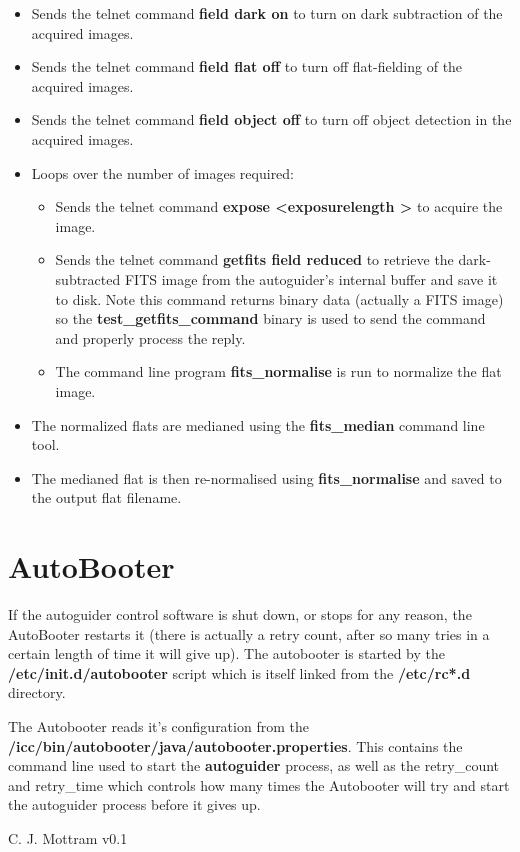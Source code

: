 \documentclass[10pt,a4paper]{article}
\begin{document}
\begin{itemize}
\item Sends the telnet command {\bf field dark on} to turn on dark subtraction of the acquired images.
\item Sends the telnet command {\bf field flat off} to turn off flat-fielding of the acquired images.
\item Sends the telnet command {\bf field object off} to turn off object detection in the acquired images.
\item Loops over the number of images required:
         \begin{itemize}
         \item Sends the telnet command {\bf expose \textless exposurelength \textgreater} to acquire the image.
	 \item Sends the telnet command {\bf getfits field reduced} to retrieve the dark-subtracted FITS image from the autoguider's internal buffer and save it to disk. Note this command returns binary data (actually a FITS image) so the {\bf test\_getfits\_command} binary is used to send the command and properly process the reply.
	 \item The command line program {\bf fits\_normalise} is run to normalize the flat image.
	 \end{itemize}
\item The normalized flats are medianed using the {\bf fits\_median} command line tool.
\item The medianed flat is then re-normalised using  {\bf fits\_normalise} and saved to the output flat filename.
\end{itemize}

\section{AutoBooter}
\label{sec:Autobooter}

If the autoguider control software is shut down, or stops for any reason, the AutoBooter restarts it (there is actually a retry count, after so many tries in a certain length of time it will give up). The autobooter is started by the {\bf /etc/init.d/autobooter} script which is itself linked from the {\bf /etc/rc*.d} directory.

The Autobooter reads it's configuration from the {\bf /icc/bin/autobooter/java/autobooter.properties}. This contains
the command line used to start the {\bf autoguider} process, as well as the retry\_count and retry\_time which controls how many times the Autobooter will try and start the autoguider process before it gives up.

\begin{thebibliography}{99}

C. J. Mottram   v0.1


\end{thebibliography}
\end{document}
